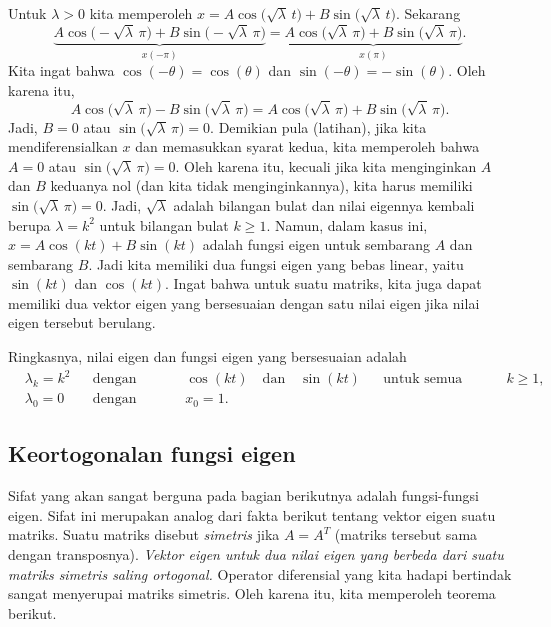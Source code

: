 \begin{example}
Untuk $\lambda > 0$ kita memperoleh
$x = A \cos \bigl( \sqrt{\lambda}\, t \bigr)
+ B \sin \bigl( \sqrt{\lambda}\, t\bigr)$.
Sekarang
\begin{equation*}
\underbrace{A \cos \bigl(-\sqrt{\lambda}\, \pi\bigr)
+ B \sin \bigl(-\sqrt{\lambda}\,
\pi\bigr)}_{x(-\pi)}
=
\underbrace{A \cos \bigl(  \sqrt{\lambda}\, \pi \bigr)
+ B \sin \bigl( \sqrt{\lambda}\,
\pi\bigr)}_{x(\pi)} .
\end{equation*}
Kita ingat bahwa $\cos (- \theta) = \cos (\theta)$ dan
$\sin (-\theta) = - \sin (\theta)$.  Oleh karena itu,
\begin{equation*}
A \cos \bigl(\sqrt{\lambda}\, \pi\bigr)
- B \sin \bigl( \sqrt{\lambda}\, \pi\bigr)
=
A \cos \bigl(\sqrt{\lambda}\, \pi\bigr)
+ B \sin \bigl( \sqrt{\lambda}\, \pi\bigr).
\end{equation*}
Jadi, $B=0$ atau $\sin \bigl( \sqrt{\lambda}\, \pi\bigr) = 0$.
Demikian pula (latihan), jika kita mendiferensialkan $x$ dan memasukkan syarat
kedua, kita memperoleh bahwa $A=0$ atau $\sin \bigl( \sqrt{\lambda}\, \pi\bigr) = 0$.
Oleh karena itu, kecuali jika kita menginginkan $A$ dan $B$ keduanya nol (dan kita tidak menginginkannya),
kita harus memiliki $\sin \bigl( \sqrt{\lambda}\, \pi \bigr) = 0$.  Jadi, $\sqrt{\lambda}$
adalah bilangan bulat dan nilai eigennya kembali berupa $\lambda = k^2$ untuk
bilangan bulat $k \geq 1$.  Namun, dalam kasus ini,
$x = A \cos (k t) + B \sin (k t)$ adalah fungsi eigen untuk sembarang $A$ dan sembarang $B$.
Jadi kita memiliki dua fungsi eigen yang bebas linear, yaitu $\sin (kt)$ dan $\cos (kt)$.
Ingat bahwa untuk suatu matriks, kita juga dapat memiliki dua vektor eigen
yang bersesuaian dengan satu nilai eigen jika nilai eigen tersebut berulang.

Ringkasnya, nilai eigen dan fungsi eigen yang bersesuaian adalah
\begin{align*}
& \lambda_k = k^2 & & \text{dengan fungsi-fungsi eigen} & &
\cos (k t) \quad \text{dan}\quad  \sin (k t)
 & & \text{untuk semua bilangan bulat } k \geq 1 , \\
& \lambda_0 = 0 & & \text{dengan fungsi eigen} & & x_0 = 1.
\end{align*}
\end{example}

\subsection{Keortogonalan fungsi eigen}

Sifat yang akan sangat berguna pada bagian berikutnya adalah
\emph{} fungsi-fungsi eigen. Sifat ini merupakan analog
dari fakta berikut tentang vektor eigen suatu matriks.  Suatu matriks
disebut
\emph{simetris}
jika $A = A^T$ (matriks tersebut sama dengan transposnya).
\emph{Vektor eigen untuk dua nilai eigen yang berbeda dari suatu matriks
simetris saling ortogonal.}
Operator
diferensial yang kita hadapi bertindak sangat menyerupai matriks simetris.
Oleh karena itu, kita memperoleh teorema berikut.

